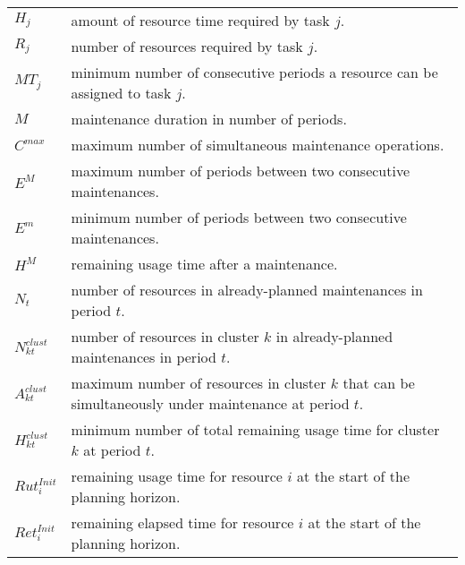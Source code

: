 \documentclass[a4paper,onecolumn,fleqn]{article}
\begin{document}
    \begin{tabular}{p{8mm}p{167mm}}
        $H_j$             & amount of resource time required by task $j$. \\
        $R_j$             & number of resources required by task $j$. \\
        $MT_j$            & minimum number of consecutive periods a resource can be assigned to task $j$. \\
        $M$               & maintenance duration in number of periods. \\
        $C^{max}$         & maximum number of simultaneous maintenance operations. \\
        $E^{M}$         & maximum number of periods between two consecutive maintenances. \\
        $E^{m}$         & minimum number of periods between two consecutive maintenances. \\
        $H^{M}$               & remaining usage time after a maintenance. \\
        $N_t$             & number of resources in already-planned maintenances in period $t$.\\
        $N^{clust}_{kt}$         & number of resources in cluster $k$ in already-planned maintenances in period $t$.\\
        $A^{clust}_{kt}$         & maximum number of resources in cluster $k$ that can be simultaneously under maintenance at period $t$.\\
        $H^{clust}_{kt}$         & minimum number of total remaining usage time for cluster $k$ at period $t$.\\
        $Rut^{Init}_{i}$  & remaining usage time for resource $i$ at the start of the planning horizon. \\
        $Ret^{Init}_{i}$  & remaining elapsed time for resource $i$ at the start of the planning horizon. \\
    \end{tabular}
\end{document}

